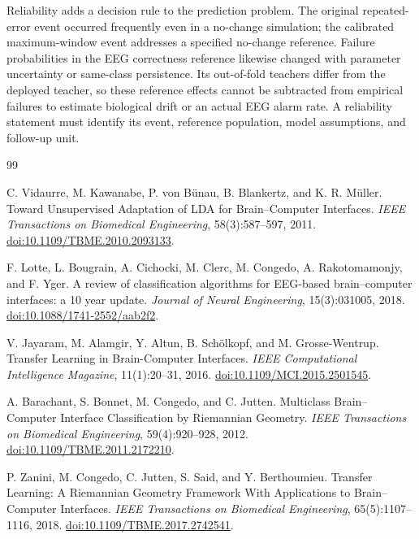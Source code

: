 \documentclass[11pt,a4paper]{article}
\begin{document}
Reliability adds a decision rule to the prediction problem. The original repeated-error event occurred frequently even in a no-change simulation; the calibrated maximum-window event addresses a specified no-change reference. Failure probabilities in the EEG correctness reference likewise changed with parameter uncertainty or same-class persistence. Its out-of-fold teachers differ from the deployed teacher, so these reference effects cannot be subtracted from empirical failures to estimate biological drift or an actual EEG alarm rate. A reliability statement must identify its event, reference population, model assumptions, and follow-up unit.

\begin{thebibliography}{99}

C. Vidaurre, M. Kawanabe, P. von B{\"u}nau, B. Blankertz, and K. R. M{\"u}ller.
Toward Unsupervised Adaptation of LDA for Brain--Computer Interfaces.
\emph{IEEE Transactions on Biomedical Engineering}, 58(3):587--597, 2011.
\href{https://doi.org/10.1109/TBME.2010.2093133}{doi:10.1109/TBME.2010.2093133}.

F. Lotte, L. Bougrain, A. Cichocki, M. Clerc, M. Congedo, A. Rakotomamonjy, and F. Yger.
A review of classification algorithms for EEG-based brain--computer interfaces: a 10 year update.
\emph{Journal of Neural Engineering}, 15(3):031005, 2018.
\href{https://doi.org/10.1088/1741-2552/aab2f2}{doi:10.1088/1741-2552/aab2f2}.

V. Jayaram, M. Alamgir, Y. Altun, B. Sch{\"o}lkopf, and M. Grosse-Wentrup.
Transfer Learning in Brain-Computer Interfaces.
\emph{IEEE Computational Intelligence Magazine}, 11(1):20--31, 2016.
\href{https://doi.org/10.1109/MCI.2015.2501545}{doi:10.1109/MCI.2015.2501545}.

A. Barachant, S. Bonnet, M. Congedo, and C. Jutten.
Multiclass Brain--Computer Interface Classification by Riemannian Geometry.
\emph{IEEE Transactions on Biomedical Engineering}, 59(4):920--928, 2012.
\href{https://doi.org/10.1109/TBME.2011.2172210}{doi:10.1109/TBME.2011.2172210}.

P. Zanini, M. Congedo, C. Jutten, S. Said, and Y. Berthoumieu.
Transfer Learning: A Riemannian Geometry Framework With Applications to Brain--Computer Interfaces.
\emph{IEEE Transactions on Biomedical Engineering}, 65(5):1107--1116, 2018.
\href{https://doi.org/10.1109/TBME.2017.2742541}{doi:10.1109/TBME.2017.2742541}.


\end{thebibliography}
\end{document}
